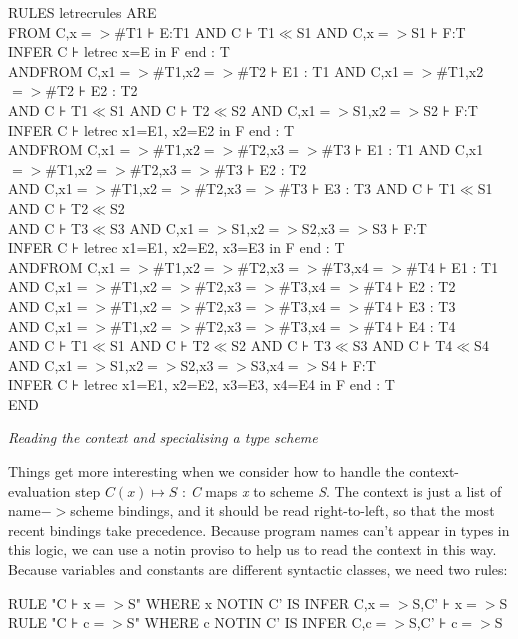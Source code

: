 RULES letrecrules ARE\\
\tab FROM C,x$=>$\#T1 ⊦ E:T1 AND C ⊦ T1$\ll$S1 AND C,x$=>$S1 ⊦ F:T\\
\tab \tab INFER C ⊦ letrec x=E in F end : T\\
AND\tab FROM C,x1$=>$\#T1,x2$=>$\#T2 ⊦ E1 : T1 AND C,x1$=>$\#T1,x2$=>$\#T2 ⊦ E2 : T2 \\
\tab AND C ⊦ T1$\ll$S1 AND C ⊦ T2$\ll$S2 AND C,x1$=>$S1,x2$=>$S2 ⊦ F:T\tab \\
\tab \tab INFER C ⊦ letrec x1=E1, x2=E2 in F end : T\\
AND\tab FROM C,x1$=>$\#T1,x2$=>$\#T2,x3$=>$\#T3 ⊦ E1 : T1 AND C,x1$=>$\#T1,x2$=>$\#T2,x3$=>$\#T3 ⊦ E2 : T2\\
\tab AND C,x1$=>$\#T1,x2$=>$\#T2,x3$=>$\#T3 ⊦ E3 : T3 AND C ⊦ T1$\ll$S1 AND C ⊦ T2$\ll$S2\\
\tab AND C ⊦ T3$\ll$S3 AND C,x1$=>$S1,x2$=>$S2,x3$=>$S3 ⊦ F:T\\
\tab \tab INFER C ⊦ letrec x1=E1, x2=E2, x3=E3 in F end : T\\
AND\tab FROM C,x1$=>$\#T1,x2$=>$\#T2,x3$=>$\#T3,x4$=>$\#T4 ⊦ E1 : T1 \\
\tab AND C,x1$=>$\#T1,x2$=>$\#T2,x3$=>$\#T3,x4$=>$\#T4 ⊦ E2 : T2\\
\tab AND C,x1$=>$\#T1,x2$=>$\#T2,x3$=>$\#T3,x4$=>$\#T4 ⊦ E3 : T3 \\
\tab AND C,x1$=>$\#T1,x2$=>$\#T2,x3$=>$\#T3,x4$=>$\#T4 ⊦ E4 : T4\\
\tab AND C ⊦ T1$\ll$S1 AND C ⊦ T2$\ll$S2 AND C ⊦ T3$\ll$S3 AND C ⊦ T4$\ll$S4\\
\tab AND C,x1$=>$S1,x2$=>$S2,x3$=>$S3,x4$=>$S4 ⊦ F:T\\
\tab \tab INFER C ⊦ letrec x1=E1, x2=E2, x3=E3, x4=E4 in F end : T\\
END


\textit{Reading the context and specialising a type scheme}


Things get more interesting when we consider how to handle the context-evaluation step $C(x)\mapsto S$ : \textit{C} maps \textit{x} to scheme \textit{S}. The context is just a list of name$->$scheme bindings, and it should be read right-to-left, so that the most recent bindings take precedence. Because program names can't appear in types in this logic, we can use a notin proviso to help us to read the context in this way. Because variables and constants are different syntactic classes, we need two rules:

RULE "C ⊦ x$=>$S" WHERE x NOTIN C' IS INFER C,x$=>$S,C' ⊦ x$=>$S\\
RULE "C ⊦ c$=>$S" WHERE c NOTIN C' IS INFER C,c$=>$S,C' ⊦ c$=>$S


